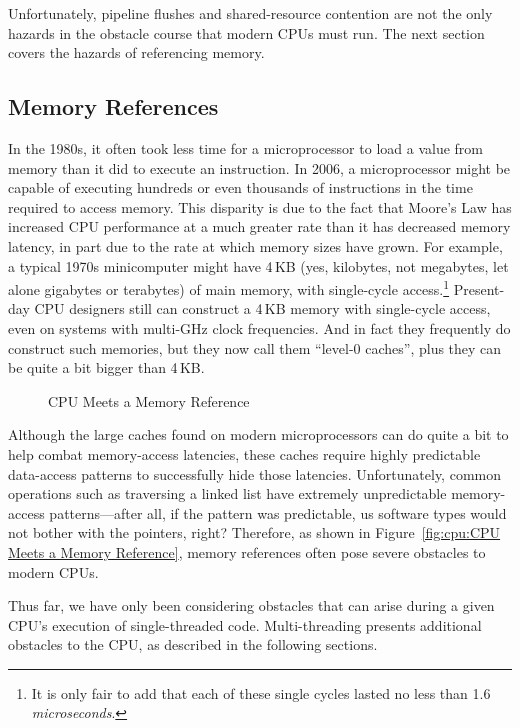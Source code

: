 Unfortunately, pipeline flushes and shared-resource contention are not
the only hazards in the obstacle course that modern CPUs must run.
The next section covers the hazards of referencing memory.

\subsection{Memory References}
\label{sec:cpu:Memory References}

In the 1980s, it often took less time for a microprocessor to load a value
from memory than it did to execute an instruction.
In 2006, a microprocessor might be capable of executing hundreds or even
thousands of instructions in the time required to access memory.
This disparity is due to the fact that Moore's Law has increased CPU
performance at a much greater rate than it has decreased memory latency,
in part due to the rate at which memory sizes have grown.
For example, a typical 1970s minicomputer might have 4\,KB (yes, kilobytes,
not megabytes, let alone gigabytes or terabytes) of main memory, with
single-cycle access.\footnote{
	It is only fair to add that each of these single cycles
	lasted no less than 1.6 \emph{microseconds}.}
Present-day CPU designers still can construct a 4\,KB memory with single-cycle
access, even on systems with multi-GHz clock frequencies.
And in fact they frequently do construct such memories, but they now
call them ``level-0 caches'', plus they can be quite a bit bigger than 4\,KB.

\begin{figure}[htb]
\centering
{}
\caption{CPU Meets a Memory Reference}
\end{figure}

Although the large caches found on modern microprocessors can do quite
a bit to help combat memory-access latencies,
these caches require highly predictable data-access patterns to
successfully hide those latencies.
Unfortunately, common operations such as traversing a linked list
have extremely unpredictable memory-access patterns---after all,
if the pattern was predictable, us software types would not bother
with the pointers, right?
Therefore, as shown in
Figure~\ref{fig:cpu:CPU Meets a Memory Reference},
memory references often pose severe obstacles to modern CPUs.

Thus far, we have only been considering obstacles that can arise during
a given CPU's execution of single-threaded code.
Multi-threading presents additional obstacles to the CPU, as
described in the following sections.

